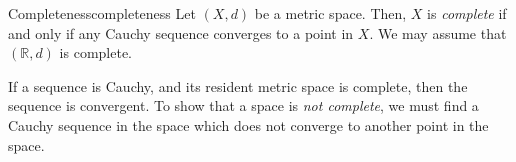 \documentclass{article}
\numberwithin{equation}{section}
\numberwithin{figure}{section}
\begin{document}
\begin{definition}{Completeness}{completeness}
    Let $ (X, d) $ be a metric space. Then, $ X $ is \emph{complete} if and only
    if any Cauchy sequence converges to a point in $ X $. We may assume that $
    (\mathbb{R}, d) $ is complete.

    If a sequence is Cauchy, and its resident metric space is complete, then the
    sequence is convergent. To show that a space is \emph{not complete}, we must
    find a Cauchy sequence in the space which does not converge to another point
    in the space.

    \centering
\end{definition}
\end{document}
